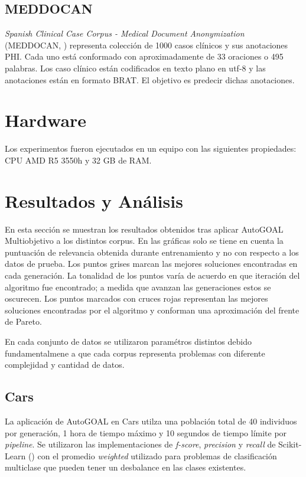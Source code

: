 \subsection{MEDDOCAN}

\textit{Spanish Clinical Case Corpus - Medical Document Anonymization} (MEDDOCAN, \cite{marimon2019automatic}) representa colecci\'on de 1000 casos cl\'inicos y sus anotaciones PHI. Cada uno est\'a conformado con aproximadamente de 33 oraciones o 495 palabras. Los caso cl\'inico est\'an codificados en texto plano en utf-8 y las anotaciones est\'an en formato BRAT. El objetivo es predecir dichas anotaciones.

\section{Hardware}
 Los experimentos fueron ejecutados en un equipo con las siguientes propiedades: CPU AMD R5 3550h y 32 GB de RAM.

\section{Resultados y An\'alisis}

En esta secci\'on se muestran los resultados obtenidos tras aplicar AutoGOAL Multiobjetivo a los distintos corpus. En las gr\'aficas solo se tiene en cuenta la puntuaci\'on de relevancia obtenida durante entrenamiento y no con respecto a los datos de prueba. Los puntos  grises marcan las mejores soluciones encontradas en cada generaci\'on.  La tonalidad de los puntos var\'ia de acuerdo en que iteraci\'on del algoritmo fue encontrado; a medida que avanzan las generaciones estos se oscurecen. Los puntos marcados con cruces rojas representan las mejores soluciones encontradas por el algoritmo y conforman una aproximaci\'on del frente de Pareto.

En cada conjunto de datos se utilizaron param\'etros distintos debido fundamentalmene a que cada corpus representa problemas con diferente complejidad y cantidad de datos.

\subsection{Cars}
La aplicaci\'on de AutoGOAL en Cars utilza una poblaci\'on total de 40 individuos por generaci\'on, 1 hora de tiempo m\'aximo y 10 segundos de tiempo l\'imite por \textit{pipeline}. Se utilizaron las implementaciones de \textit{f-score}, \textit{precision} y \textit{recall} de Scikit-Learn (\cite{pedregosa2011scikit}) con el promedio \textit{weighted} utilizado para problemas de clasificaci\'on multiclase que pueden tener un desbalance en las clases existentes.


